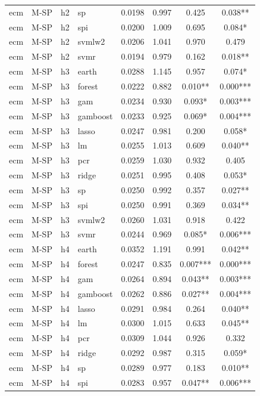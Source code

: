 \begin{ThreePartTable}
\begin{longtable}[t]{llclcccc}
ecm & M-SP & h2 & sp & 0.0198 & 0.997 & 0.425 & 0.038**\\
ecm & M-SP & h2 & spi & 0.0200 & 1.009 & 0.695 & 0.084*\\
ecm & M-SP & h2 & svmlw2 & 0.0206 & 1.041 & 0.970 & 0.479\\
ecm & M-SP & h2 & svmr & 0.0194 & 0.979 & 0.162 & 0.018**\\
\addlinespace
ecm & M-SP & h3 & earth & 0.0288 & 1.145 & 0.957 & 0.074*\\
ecm & M-SP & h3 & forest & 0.0222 & 0.882 & 0.010** & 0.000***\\
ecm & M-SP & h3 & gam & 0.0234 & 0.930 & 0.093* & 0.003***\\
ecm & M-SP & h3 & gamboost & 0.0233 & 0.925 & 0.069* & 0.004***\\
ecm & M-SP & h3 & lasso & 0.0247 & 0.981 & 0.200 & 0.058*\\
ecm & M-SP & h3 & lm & 0.0255 & 1.013 & 0.609 & 0.040**\\
ecm & M-SP & h3 & pcr & 0.0259 & 1.030 & 0.932 & 0.405\\
ecm & M-SP & h3 & ridge & 0.0251 & 0.995 & 0.408 & 0.053*\\
ecm & M-SP & h3 & sp & 0.0250 & 0.992 & 0.357 & 0.027**\\
ecm & M-SP & h3 & spi & 0.0250 & 0.991 & 0.369 & 0.034**\\
ecm & M-SP & h3 & svmlw2 & 0.0260 & 1.031 & 0.918 & 0.422\\
ecm & M-SP & h3 & svmr & 0.0244 & 0.969 & 0.085* & 0.006***\\
\addlinespace
ecm & M-SP & h4 & earth & 0.0352 & 1.191 & 0.991 & 0.042**\\
ecm & M-SP & h4 & forest & 0.0247 & 0.835 & 0.007*** & 0.000***\\
ecm & M-SP & h4 & gam & 0.0264 & 0.894 & 0.043** & 0.003***\\
ecm & M-SP & h4 & gamboost & 0.0262 & 0.886 & 0.027** & 0.004***\\
ecm & M-SP & h4 & lasso & 0.0291 & 0.984 & 0.264 & 0.040**\\
ecm & M-SP & h4 & lm & 0.0300 & 1.015 & 0.633 & 0.045**\\
ecm & M-SP & h4 & pcr & 0.0309 & 1.044 & 0.926 & 0.332\\
ecm & M-SP & h4 & ridge & 0.0292 & 0.987 & 0.315 & 0.059*\\
ecm & M-SP & h4 & sp & 0.0289 & 0.977 & 0.183 & 0.010**\\
ecm & M-SP & h4 & spi & 0.0283 & 0.957 & 0.047** & 0.006***\\

\end{longtable}
\end{ThreePartTable}
